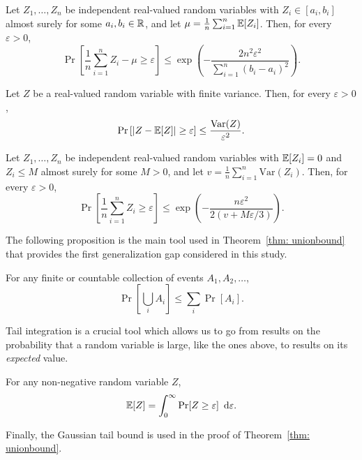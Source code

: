 \documentclass[reqno]{amsart}
\begin{document}
\begin{theorem}\label{app: hoeffding}
  Let $Z_1,\ldots,Z_n$ be independent real-valued random variables with $Z_i\in[a_i,b_i]$ almost surely for some $a_i,b_i\in\mathbb{R}$, and let $\mu = \frac1n\sum_{i=1}^n \mathbb{E}[Z_i]$. Then, for every $\varepsilon>0$,
  \[
  \Pr\left[\frac1n\sum_{i=1}^n Z_i - \mu \ge \varepsilon\right] \le \exp\left(-\frac{2n^2\varepsilon^2}{\sum_{i=1}^n (b_i-a_i)^2}\right).
  \]
\end{theorem}

\begin{theorem}\label{app: chebyshev}
  Let $Z$ be a real-valued random variable with finite variance. Then, for every $\varepsilon>0$,
  \[
  \Pr\left[\vert Z - \mathbb{E}[Z]\vert \ge \varepsilon\right] \le \frac{\operatorname{Var}(Z)}{\varepsilon^2}.
  \]
\end{theorem}

\begin{theorem}\label{app: bernstein}
  Let $Z_1,\ldots,Z_n$ be independent real-valued random variables with $\mathbb{E}[Z_i]=0$ and $Z_i\le M$ almost surely for some $M>0$, and let $v = \frac1n\sum_{i=1}^n \mathrm{Var}(Z_i)$. Then, for every $\varepsilon>0$,
  \[
  \Pr\left[\frac1n\sum_{i=1}^n Z_i \ge \varepsilon\right] \le \exp\left(-\frac{n\varepsilon^2}{2(v + M\varepsilon/3)}\right).
  \]
\end{theorem}

The following proposition is the main tool used in Theorem~\ref{thm: unionbound} that provides the first generalization gap considered in this study. 

\begin{proposition}\label{app: unionbound}
  For any finite or countable collection of events $A_1, A_2, \ldots$,
  \[
  \Pr\left[\bigcup_i A_i\right] \le \sum_i \Pr[A_i].
  \]
\end{proposition}

Tail integration is a crucial tool which allows us to go from results on the probability that a random variable is large, like the ones above, to results on its {\it expected\/} value. 

\begin{proposition}\label{app: tail int}
  For any non-negative random variable $Z$,
  \[
  \mathbb{E}[Z] = \int_0^\infty \Pr[Z\ge \varepsilon] \mathop{}\!\,\,\mathrm{d} \varepsilon.
  \]
\end{proposition}

Finally, the Gaussian tail bound is used in the proof of Theorem~\ref{thm: unionbound}. 
\end{document}
